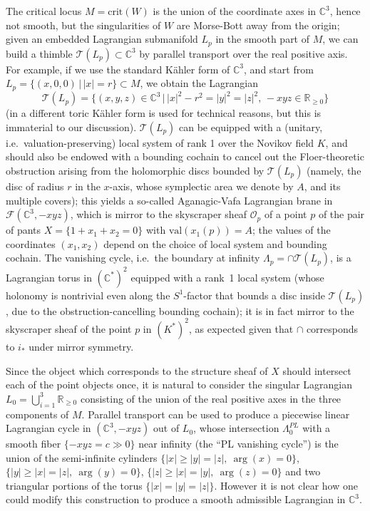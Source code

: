 \documentclass[11pt,leqno]{amsart}
\numberwithin{equation}{section}
\def\R{\mathbb{R}}
\def\C{\mathbb{C}}
\def\val{\mathrm{val}}
\def\crit{\mathrm{crit}}
\def\F{{\mathcal F}}
\def\O{{\mathcal O}}
\begin{document}
The critical locus $M=\crit(W)$ is the union of the coordinate axes in $\C^3$,
hence not smooth, but the
singularities of $W$ are Morse-Bott away from the origin; given an embedded 
Lagrangian submanifold $L_p$ in the smooth part of $M$, we can 
build a thimble $\mathcal{T}(L_p)\subset \C^3$ by parallel transport over
the real positive axis. For example, if we use the standard K\"ahler form of
$\C^3$, and start from $L_p=\{(x,0,0)\,|\,|x|=r\}\subset M$, we obtain the
Lagrangian $$\mathcal{T}(L_p)=\bigl\{(x,y,z)\in\C^3\,\big|\,|x|^2-r^2=|y|^2=|z|^2,\,
-xyz\in \R_{\geq 0}\bigr\}$$
(in \cite{AA} a different toric K\"ahler form is used for technical reasons, but
this is immaterial to our discussion).
$\mathcal{T}(L_p)$ can be equipped with a (unitary, i.e.\ valuation-preserving)
local system of rank 1 over the Novikov field $K$, and should also be endowed
with a bounding cochain to cancel out the Floer-theoretic obstruction arising from the holomorphic discs bounded by
$\mathcal{T}(L_p)$ (namely, the disc of radius $r$ in the $x$-axis, whose symplectic
area we denote by $A$, and its multiple covers); this yields a
so-called Aganagic-Vafa Lagrangian brane in $\F(\C^3,-xyz)$, which is mirror
to the skyscraper sheaf $\O_p$ of a point $p$ of the pair of pants $X=\{1+x_1+x_2=0\}$
with $\val(x_1(p))=A$; the values of the coordinates $(x_1,x_2)$ depend on
the choice of local system and bounding cochain. 
The vanishing cycle, i.e.\ the boundary at infinity $\Lambda_p=\cap\mathcal{T}(L_p)$,
is a Lagrangian torus in $(\C^*)^2$ equipped with a rank~1 local system
(whose holonomy is nontrivial even along the $S^1$-factor that bounds a
disc inside $\mathcal{T}(L_p)$, due to the obstruction-cancelling bounding cochain);
it is in fact mirror to the skyscraper sheaf of the point $p$ in $(K^*)^2$,
as expected given that $\cap$ corresponds to $i_*$ under mirror symmetry.

Since the object which corresponds to the structure sheaf of $X$ should intersect each of
the point objects once, it is natural to consider 
the singular Lagrangian $L_0=\bigcup_{i=1}^3 \R_{\geq 0}$ consisting of
the union of the real positive axes in the three components of $M$. 
Parallel transport can be used to produce a piecewise linear Lagrangian
cycle in $(\C^3,-xyz)$ out of $L_0$, whose intersection $\Lambda_0^{PL}$ 
with a smooth fiber $\{-xyz=c\gg 0\}$ near infinity (the ``PL vanishing cycle'')
is the union of the semi-infinite cylinders $\{|x|\geq |y|=|z|,\ \arg(x)=0\}$,
$\{|y|\geq |x|=|z|,\ \arg(y)=0\}$, $\{|z|\geq |x|=|y|,\ \arg(z)=0\}$ and two
triangular portions of the torus $\{|x|=|y|=|z|\}$.
However it is not clear how one could modify this construction to produce a smooth admissible Lagrangian
in $\C^3$. 
\end{document}
